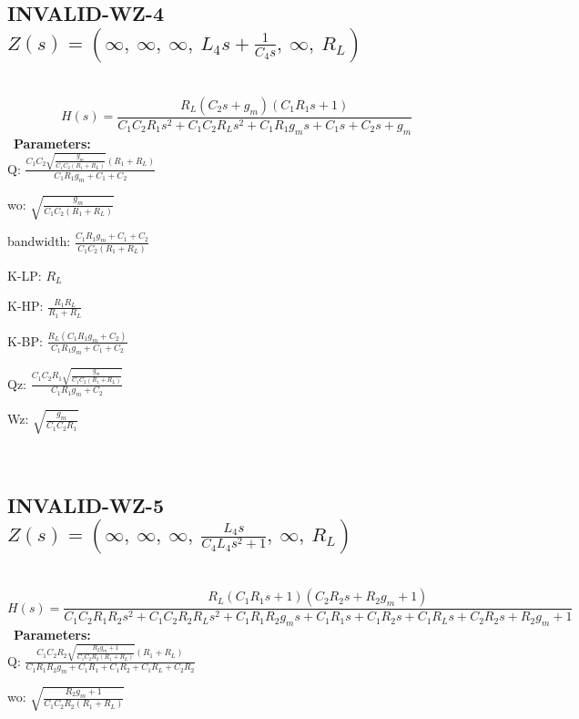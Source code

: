 \documentclass{article}
\begin{document}
\subsection{INVALID-WZ-4 $Z(s) = \left( \infty, \  \infty, \  \infty, \  L_{4} s + \frac{1}{C_{4} s}, \  \infty, \  R_{L}\right)$ } \ 
\textbf{\[H(s) = \frac{R_{L} \left(C_{2} s + g_{m}\right) \left(C_{1} R_{1} s + 1\right)}{C_{1} C_{2} R_{1} s^{2} + C_{1} C_{2} R_{L} s^{2} + C_{1} R_{1} g_{m} s + C_{1} s + C_{2} s + g_{m}}\] } \ 
\textbf{Parameters:}\\ 

Q: $\frac{C_{1} C_{2} \sqrt{\frac{g_{m}}{C_{1} C_{2} \left(R_{1} + R_{L}\right)}} \left(R_{1} + R_{L}\right)}{C_{1} R_{1} g_{m} + C_{1} + C_{2}}$\ 

wo: $\sqrt{\frac{g_{m}}{C_{1} C_{2} \left(R_{1} + R_{L}\right)}}$\ 

bandwidth: $\frac{C_{1} R_{1} g_{m} + C_{1} + C_{2}}{C_{1} C_{2} \left(R_{1} + R_{L}\right)}$\ 

K-LP: $R_{L}$\ 

K-HP: $\frac{R_{1} R_{L}}{R_{1} + R_{L}}$\ 

K-BP: $\frac{R_{L} \left(C_{1} R_{1} g_{m} + C_{2}\right)}{C_{1} R_{1} g_{m} + C_{1} + C_{2}}$\ 

Qz: $\frac{C_{1} C_{2} R_{1} \sqrt{\frac{g_{m}}{C_{1} C_{2} \left(R_{1} + R_{L}\right)}}}{C_{1} R_{1} g_{m} + C_{2}}$\ 

Wz: $\sqrt{\frac{g_{m}}{C_{1} C_{2} R_{1}}}$\ 

\ 

\subsection{INVALID-WZ-5 $Z(s) = \left( \infty, \  \infty, \  \infty, \  \frac{L_{4} s}{C_{4} L_{4} s^{2} + 1}, \  \infty, \  R_{L}\right)$ } \ 
\textbf{\[H(s) = \frac{R_{L} \left(C_{1} R_{1} s + 1\right) \left(C_{2} R_{2} s + R_{2} g_{m} + 1\right)}{C_{1} C_{2} R_{1} R_{2} s^{2} + C_{1} C_{2} R_{2} R_{L} s^{2} + C_{1} R_{1} R_{2} g_{m} s + C_{1} R_{1} s + C_{1} R_{2} s + C_{1} R_{L} s + C_{2} R_{2} s + R_{2} g_{m} + 1}\] } \ 
\textbf{Parameters:}\\ 

Q: $\frac{C_{1} C_{2} R_{2} \sqrt{\frac{R_{2} g_{m} + 1}{C_{1} C_{2} R_{2} \left(R_{1} + R_{L}\right)}} \left(R_{1} + R_{L}\right)}{C_{1} R_{1} R_{2} g_{m} + C_{1} R_{1} + C_{1} R_{2} + C_{1} R_{L} + C_{2} R_{2}}$\ 

wo: $\sqrt{\frac{R_{2} g_{m} + 1}{C_{1} C_{2} R_{2} \left(R_{1} + R_{L}\right)}}$\ 
\end{document}
